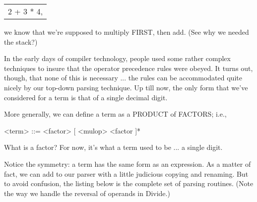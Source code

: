 \documentclass[float=false, crop=false]{standalone}
\begin{document}
\begin{center}
  \begin{tabular}{l}
    2 + 3 * 4,
  \end{tabular}
\end{center}

we know that we're supposed to multiply FIRST, then  add.    (See
why we needed the stack?)

In the early days of compiler technology, people used some rather
complex techniques to insure that the  operator  precedence rules
were  obeyed.    It turns out,  though,  that  none  of  this  is
necessary ... the rules can be accommodated quite  nicely  by our
top-down  parsing technique.  Up till now,  the  only  form  that
we've considered for a term is that of a  single  decimal  digit.

More generally, we  can  define  a  term as a PRODUCT of FACTORS;
i.e.,

          <term> ::= <factor>  [ <mulop> <factor ]*

What is a factor? For now, it's what a term used to be ... a single digit.

Notice the symmetry: a term has the same form as an expression. As a matter of
fact, we can add to our parser with a little judicious copying and renaming. But
to avoid confusion, the listing below is the complete set of parsing routines.
(Note the way we handle the reversal of operands in Divide.)
\end{document}
